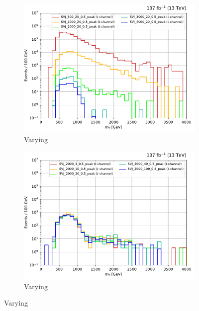 \begin{figure}[htbp]
    \centering
    \begin{subfigure}[b]{0.49\textwidth}
        \includegraphics[width=\textwidth]{figures/t_channel_benchmark_variations/mPhi.pdf}
        \caption{Varying \mBifund}
    \end{subfigure}
    \hfill
    \begin{subfigure}[b]{0.49\textwidth}
        \includegraphics[width=\textwidth]{figures/t_channel_benchmark_variations/mD.pdf}
        \caption{Varying \mDark}
    \end{subfigure}


\end{figure}
